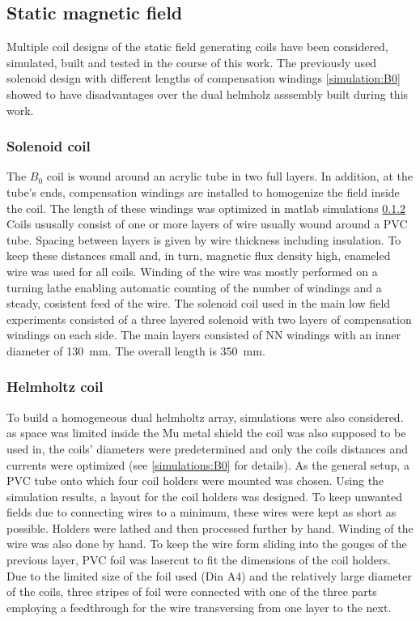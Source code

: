         \subsection{Static magnetic field}
            Multiple coil designs of the static field generating coils have been  considered, simulated, built and tested in the course of this work. The previously used solenoid design with different lengths of compensation windings \ref{simulation:B0} showed to have disadvantages over the dual helmholz asssembly built during this work.
        \subsubsection{Solenoid coil}
            The $B_0$ coil is wound around an acrylic tube in two full layers. In addition, at the
            tube's ends, compensation windings are installed to homogenize the field inside the coil.
            The length of these windings was optimized in matlab simulations \ref{} 
            Coils ususally consist of one or more layers of wire usually wound around a PVC tube. Spacing between layers is given by wire thickness including insulation. To keep  these distances small and, in turn, magnetic flux density high, enameled wire was used for all coils. Winding of the wire was mostly performed on a turning lathe enabling automatic counting of the number of windings and a steady, cosistent feed of the wire.
            The solenoid coil used in the main low field experiments consisted of a three layered solenoid with two layers of compensation windings on each side. The main layers consisted of NN windings with an inner diameter of \SI{130}{\mm}. The overall length is \SI{350}{\milli\meter}.
        \subsubsection{Helmholtz coil}
            To build a homogeneous dual helmholtz array, simulations were also considered. as space was limited inside the Mu metal shield the coil was also supposed to be used in, the coils' diameters were predetermined and only the coils distances and currents were optimized (see \ref{simulations:B0} for details). As the general setup, a PVC tube onto which four coil holders  were mounted was chosen. Using the simulation results, a layout for the coil holders was designed. To keep unwanted fields due to connecting wires to a minimum, these wires were kept as short as possible. Holders were lathed and then processed further by hand. Winding of the wire was also done by hand. To keep the wire form sliding into the gouges of the previous layer, PVC foil was lasercut to fit the dimensions of the coil holders. Due to the limited size of the foil used (Din A4) and the relatively large diameter of the coils, three stripes of foil were connected with one of the three parts employing a feedthrough for the wire transversing from one layer to the next. 
